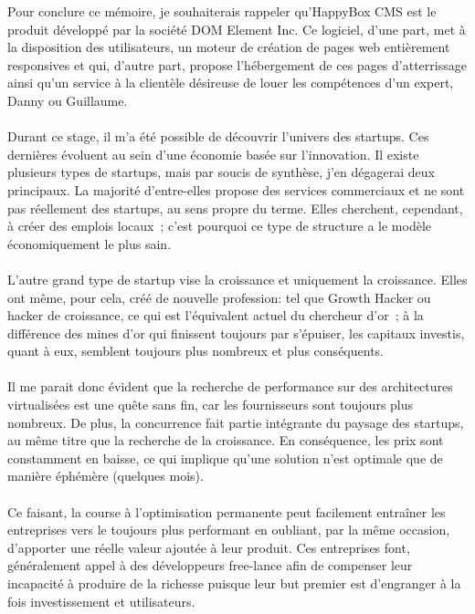 \documentclass[11pt, a4paper ]{article}
\begin{document}
\begin{spacing}{1.5}



Pour conclure ce mémoire, je souhaiterais rappeler qu'HappyBox CMS est le produit développé par la société DOM Element Inc. Ce logiciel, d'une part, met à la disposition des utilisateurs, un moteur de création de pages web entièrement responsives et qui, d'autre part, propose l'hébergement de ces pages d’atterrissage ainsi qu'un service à la clientèle désireuse de louer les compétences d'un expert, Danny ou Guillaume.
\paragraph{}
Durant ce stage, il m'a été possible de découvrir l'univers des startups. Ces dernières évoluent au sein d'une économie basée sur l'innovation. Il existe plusieurs types de startups, mais par soucis de synthèse, j'en dégagerai deux principaux. 
La majorité d'entre-elles propose des services commerciaux et ne sont pas réellement des startups, au sens propre du terme. Elles cherchent, cependant, à créer des emplois locaux ; c'est pourquoi ce type de structure a le modèle économiquement le plus sain.
\paragraph{}
L'autre grand type de startup vise la croissance et uniquement la croissance. Elles ont même, pour cela, créé de nouvelle profession: tel que Growth Hacker ou hacker de croissance, ce qui est l'équivalent actuel du chercheur d'or ; à la différence des mines d'or qui finissent toujours par s'épuiser, les capitaux investis, quant à eux, semblent toujours plus nombreux et plus conséquents.

\paragraph{}
Il me parait donc évident que la recherche de performance sur des architectures virtualisées est une quête sans fin, car les fournisseurs sont toujours plus nombreux. De plus, la concurrence fait partie intégrante du paysage des startups, au même titre que la recherche de la croissance. En conséquence, les prix sont constamment en baisse, ce qui implique qu'une solution n'est optimale que de manière éphémère (quelques mois). 

\paragraph{}
Ce faisant, la course à l'optimisation permanente peut facilement entraîner les entreprises vers le toujours plus performant en oubliant, par la même occasion, d'apporter une réelle valeur ajoutée à leur produit. Ces entreprises font, généralement appel à des développeurs free-lance afin de compenser leur incapacité à produire de la richesse puisque leur but premier est d'engranger à la fois investissement et utilisateurs.


\end{spacing}
\end{document}
